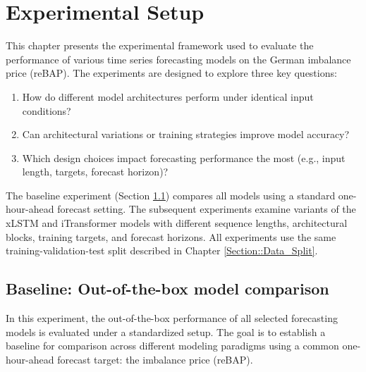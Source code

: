 \documentclass[class=scrbook, crop=false]{standalone}
\begin{document}
\chapter{Experimental Setup} %
\label{Chapter::Experimental_Setup}

This chapter presents the experimental framework used to evaluate the performance of various time series forecasting models on the German imbalance price (reBAP). The experiments are designed to explore three key questions:

\begin{enumerate}
\item How do different model architectures perform under identical input conditions?
\item Can architectural variations or training strategies improve model accuracy?
\item Which design choices impact forecasting performance the most (e.g., input length, targets, forecast horizon)?
\end{enumerate}

The baseline experiment (Section \ref{Section::Experiment_out_of_the_box}) compares all models using a standard one-hour-ahead forecast setting. The subsequent experiments examine variants of the xLSTM and iTransformer models with different sequence lengths, architectural blocks, training targets, and forecast horizons. All experiments use the same training-validation-test split described in Chapter \ref{Section::Data_Split}.


\section{Baseline: Out-of-the-box model comparison}
\label{Section::Experiment_out_of_the_box}

In this experiment, the out-of-the-box performance of all selected forecasting models is evaluated under a standardized setup. The goal is to establish a baseline for comparison across different modeling paradigms using a common one-hour-ahead forecast target: the imbalance price (reBAP).
\end{document}
